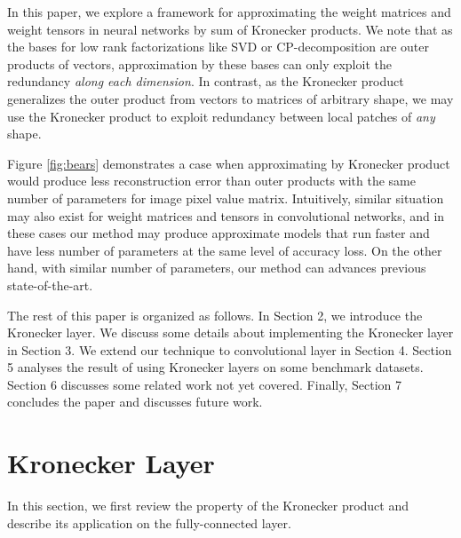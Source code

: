 \documentclass{article}
\begin{document}
In this paper, we explore a framework for approximating the weight matrices and weight tensors in neural networks by sum of Kronecker products.
 We note that as
 the bases for low rank factorizations like SVD or CP-decomposition are outer products of vectors, approximation by these bases can only exploit the redundancy \emph{along each dimension}. In contrast, as the Kronecker product generalizes the outer product from vectors to matrices of arbitrary shape, we may use the Kronecker product to exploit
 redundancy between local patches of \emph{any} shape.

 Figure \ref{fig:bears} demonstrates a case when approximating by Kronecker product would produce less reconstruction error than outer products with
 the same number of parameters for image pixel value matrix. Intuitively, similar situation may also exist for weight matrices and tensors in
 convolutional networks, and in these cases our method may produce approximate models that run faster and have less number of parameters at the same
 level of accuracy loss. On the other hand, with similar number of parameters, our method can advances previous state-of-the-art.

The rest of this paper is organized as follows. In Section 2, we introduce the Kronecker layer. We discuss some details about implementing the Kronecker layer in Section 3. We extend our technique to convolutional layer in Section 4. Section 5 analyses the result of using Kronecker layers on some benchmark datasets. Section 6 discusses some related work not yet covered. Finally, Section 7 concludes the paper and discusses future work.

\section{Kronecker Layer}
In this section, we first review the property of the Kronecker product and describe its application on the fully-connected layer.
\end{document}
